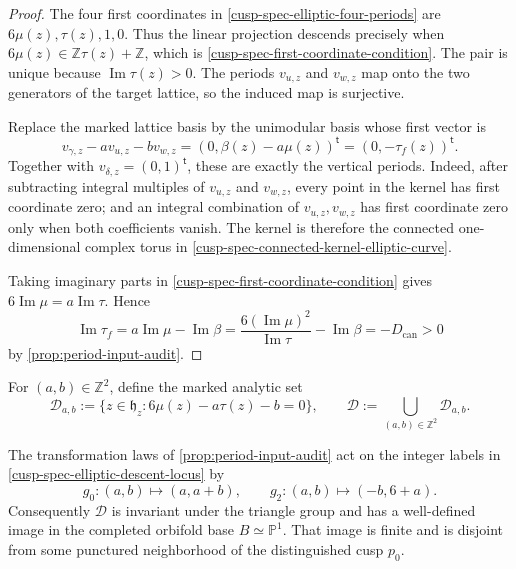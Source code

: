\begin{proof}
The four first coordinates in \cref{cusp-spec-elliptic-four-periods} are
\(6\mu(z),\tau(z),1,0\).  Thus the linear projection descends precisely when
\(6\mu(z)\in\mathbb Z\tau(z)+\mathbb Z\), which is
\cref{cusp-spec-first-coordinate-condition}.  The pair is unique because
\(\operatorname{Im}\tau(z)>0\).  The periods \(v_{u,z}\) and \(v_{w,z}\)
map onto the two generators of the target lattice, so the induced map is
surjective.

Replace the marked lattice basis by the unimodular basis whose first vector
is
\begin{equation}
 v_{\gamma,z}-av_{u,z}-bv_{w,z}
 =(0,\beta(z)-a\mu(z))^{\mathsf t}
 =(0,-\tau_f(z))^{\mathsf t}.
 \label{cusp-spec-vertical-unimodular-period}
\end{equation}
Together with \(v_{\delta,z}=(0,1)^{\mathsf t}\), these are exactly the
vertical periods.  Indeed, after subtracting integral multiples of
\(v_{u,z}\) and \(v_{w,z}\), every point in the kernel has first coordinate
zero; and an integral combination of \(v_{u,z},v_{w,z}\) has first
coordinate zero only when both coefficients vanish.  The kernel is therefore
the connected one-dimensional complex torus in
\cref{cusp-spec-connected-kernel-elliptic-curve}.

Taking imaginary parts in
\cref{cusp-spec-first-coordinate-condition} gives
\(6\operatorname{Im}\mu=a\operatorname{Im}\tau\).  Hence
\[
 \operatorname{Im}\tau_f
 =a\operatorname{Im}\mu-\operatorname{Im}\beta
 =\frac{6(\operatorname{Im}\mu)^2}{\operatorname{Im}\tau}
  -\operatorname{Im}\beta
 =-D_{\mathrm{can}}>0
\]
by \cref{prop:period-input-audit}.
\end{proof}

For \((a,b)\in\mathbb Z^2\), define the marked analytic set
\begin{equation}
 \mathcal D_{a,b}:=
 \{z\in\mathfrak h_z:6\mu(z)-a\tau(z)-b=0\},
 \qquad
 \mathcal D:=\bigcup_{(a,b)\in\mathbb Z^2}\mathcal D_{a,b}.
 \label{cusp-spec-elliptic-descent-locus}
\end{equation}

\begin{theorem}
\label{cusp-spec-elliptic-descent-finiteness}
The transformation laws of \cref{prop:period-input-audit} act on the integer
labels in \cref{cusp-spec-elliptic-descent-locus} by
\begin{equation}
 g_0:(a,b)\longmapsto(a,a+b),
 \qquad
 g_2:(a,b)\longmapsto(-b,6+a).
 \label{cusp-spec-descent-label-monodromy}
\end{equation}
Consequently \(\mathcal D\) is invariant under the triangle group and has a
well-defined image in the completed orbifold base \(B\simeq\mathbb P^1\).
That image is finite and is disjoint from some punctured neighborhood of the
distinguished cusp \(p_0\).
\end{theorem}

